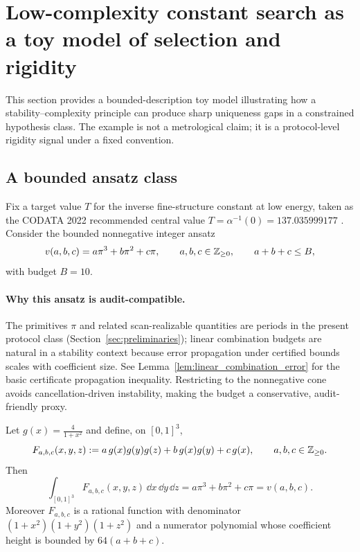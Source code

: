 
\section{Low-complexity constant search as a toy model of selection and rigidity}
\label{sec:constant_search}

This section provides a bounded-description toy model illustrating how a stability--complexity principle can produce sharp uniqueness gaps in a constrained hypothesis class.
The example is not a metrological claim; it is a protocol-level rigidity signal under a fixed convention.

\subsection{A bounded ansatz class}
\label{sec:ansatz}

Fix a target value $T$ for the inverse fine-structure constant at low energy, taken as the CODATA 2022 recommended central value $T=\alpha^{-1}(0)=137.035999177$ \cite{CODATA2022RMP}.
Consider the bounded nonnegative integer ansatz
\begin{equation}
\label{eq:alpha_ansatz}
v(a,b,c)=a\pi^3+b\pi^2+c\pi,
\qquad
a,b,c\in\mathbb{Z}_{\ge 0},
\qquad
a+b+c\le B,
\end{equation}
with budget $B=10$.

\paragraph{Why this ansatz is audit-compatible.}
The primitives $\pi$ and related scan-realizable quantities are periods in the present protocol class (Section~\ref{sec:preliminaries}); linear combination budgets are natural in a stability context because error propagation under certified bounds scales with coefficient size.
See Lemma~\ref{lem:linear_combination_error} for the basic certificate propagation inequality.
Restricting to the nonnegative cone avoids cancellation-driven instability, making the budget a conservative, audit-friendly proxy.

\begin{proposition}
\label{prop:abc_rational_kernel}
Let $g(x)=\frac{4}{1+x^2}$ and define, on $[0,1]^3$,
\[
F_{a,b,c}(x,y,z)
:=
a\,g(x)g(y)g(z)+b\,g(x)g(y)+c\,g(x),
\qquad a,b,c\in\mathbb{Z}_{\ge 0}.
\]
Then
\[
\int_{[0,1]^3}F_{a,b,c}(x,y,z)\,\dd x\,\dd y\,\dd z
=a\pi^3+b\pi^2+c\pi=v(a,b,c).
\]
Moreover $F_{a,b,c}$ is a rational function with denominator $(1+x^2)(1+y^2)(1+z^2)$ and a numerator polynomial whose coefficient height is bounded by $64(a+b+c)$.
\end{proposition}

